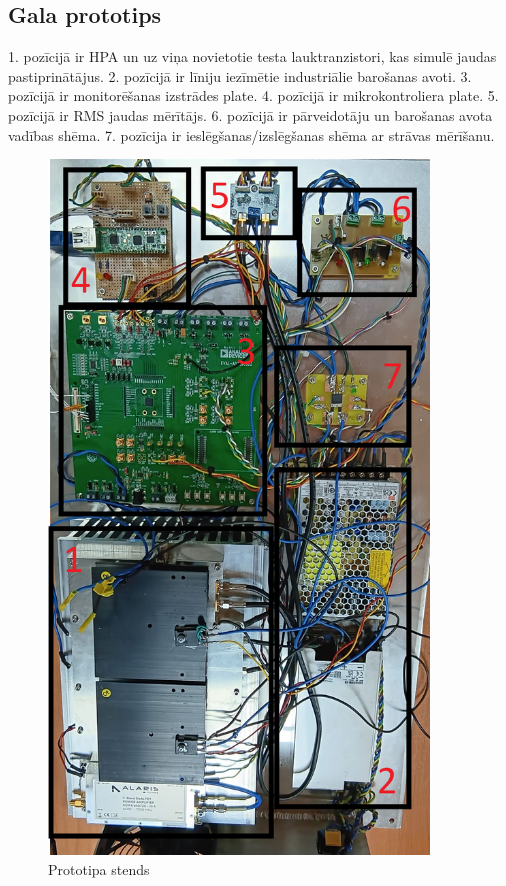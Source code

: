 \subsection{Gala prototips}
1. pozīcijā ir HPA un uz viņa novietotie testa lauktranzistori, kas simulē jaudas pastiprinātājus. 2. pozīcijā ir līniju iezīmētie industriālie barošanas avoti. 3. pozīcijā ir monitorēšanas izstrādes plate. 4. pozīcijā ir mikrokontroliera plate. 5. pozīcijā ir RMS jaudas mērītājs. 6. pozīcijā ir pārveidotāju un barošanas avota vadības shēma. 7. pozīcija ir ieslēgšanas/izslēgšanas shēma ar strāvas mērīšanu. 
\begin{figure}[H]
	\centering
    \includegraphics[width=0.9\textwidth]{pictures/finished.png}\hspace{1cm}
    \caption{Prototipa stends}
\end{figure}